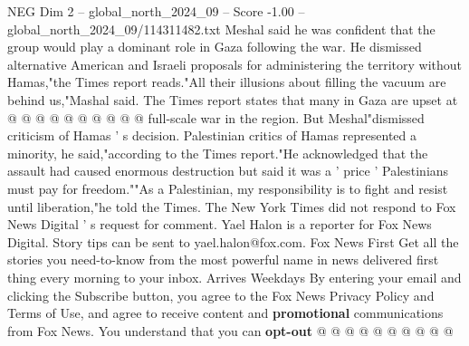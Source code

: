 \begin{textsample}{NEG Dim 2 – global\_north\_2024\_09 – Score -1.00 – global\_north\_2024\_09/114311482.txt}
Meshal said he was confident that the group would play a dominant role in Gaza following the war.
He dismissed alternative American and Israeli proposals for administering the territory without Hamas,"the Times report reads."All their illusions about filling the vacuum are behind us,"Mashal said.
The Times report states that many in Gaza are upset at @ @ @ @ @ @ @ @ @ @ full-scale war in the region.
But Meshal"dismissed criticism of Hamas ' s decision.
Palestinian critics of Hamas represented a minority, he said,"according to the Times report."He acknowledged that the assault had caused enormous destruction but said it was a ' price ' Palestinians must pay for freedom.""As a Palestinian, my responsibility is to fight and resist until liberation,"he told the Times.
The New York Times did not respond to Fox News Digital ' s request for comment.
Yael Halon is a reporter for Fox News Digital.
Story tips can be sent to yael.halon@fox.com.
Fox News First Get all the stories you need-to-know from the most powerful name in news delivered first thing every morning to your inbox.
Arrives Weekdays By entering your email and clicking the Subscribe button, you agree to the Fox News Privacy Policy and Terms of Use, and agree to receive content and \textbf{promotional} communications from Fox News.
You understand that you can \textbf{opt-out} @ @ @ @ @ @ @ @ @ @

\end{textsample}
